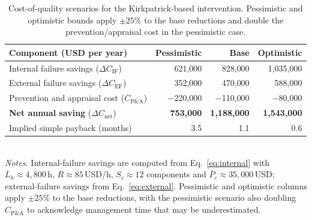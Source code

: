 \begin{table}[!htbp]
  \centering
  \caption{Cost-of-quality scenarios for the Kirkpatrick-based intervention.
           Pessimistic and optimistic bounds apply $\pm25\%$ to the base
           reductions and double the prevention/appraisal cost in the
           pessimistic case.}
  \label{tab:coq-scenarios}
  \small
  \begin{tabular}{@{}p{6.5cm}rrr@{}}
    \toprule
    \textbf{Component (USD per year)} & \textbf{Pessimistic} & \textbf{Base} & \textbf{Optimistic} \\
    \midrule
    Internal failure savings ($\Delta C_{\text{IF}}$)        & 621{,}000   & 828{,}000   & 1{,}035{,}000 \\
    External failure savings ($\Delta C_{\text{EF}}$)        & 352{,}000   & 470{,}000   & 588{,}000 \\
    Prevention and appraisal cost ($C_{\text{P\&A}}$)        & $-$220{,}000 & $-$110{,}000 & $-$80{,}000 \\
    \midrule
    \textbf{Net annual saving} ($\Delta C_{\text{net}}$)     & \textbf{753{,}000} & \textbf{1{,}188{,}000} & \textbf{1{,}543{,}000} \\
    \midrule
    Implied simple payback (months)                          & 3.5         & 1.1         & 0.6 \\
    \bottomrule
  \end{tabular}\\[2pt]
  \footnotesize
  \emph{Notes.} Internal-failure savings are computed from
  Eq.~\eqref{eq:internal} with $L_h \approx 4{,}800$\,h, $R \approx
  85$\,USD/h, $S_c \approx 12$ components and $\bar{P}_c \approx
  35{,}000$\,USD; external-failure savings from
  Eq.~\eqref{eq:external}. Pessimistic and optimistic columns apply
  $\pm 25\%$ to the base reductions, with the pessimistic scenario also
  doubling $C_{\text{P\&A}}$ to acknowledge management time that may be
  underestimated.
\end{table}

